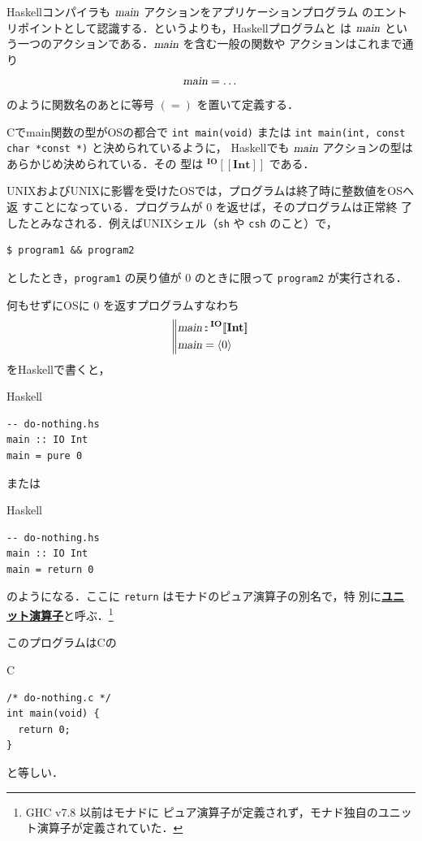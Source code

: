 \documentclass[a5paper,twoside,fleqn,draft]{jsbook}
\def\[{[\![}
\def\]{]\!]}
\newcommand{\programminglanguage}[1]{\textsf{#1}}
\newcommand{\clang}{\programminglanguage{C}}
\newcommand{\haskell}{\programminglanguage{Haskell}}
\newcommand{\keyword}[1]{{\underline{\textbf{#1}}}}
\newcommand{\code}[1]{\texttt{#1}}
\newcommand{\filename}[1]{\texttt{#1}}
\newenvironment{ccode}{\begin{itembox}[r]{\clang}}{\end{itembox}}
\newenvironment{haskellcode}{\begin{itembox}[r]{\haskell}}{\end{itembox}}
\newcommand{\mBrace}{\Vert}
\newcommand{\mAction}[1]{\textsl{#1}}
\DeclareMathOperator{\mMain}{\mAction{main}}
\DeclareMathOperator{\mIn}{{:\!:}}
\newcommand{\mType}[1]{\mathbf{#1}} %
\newcommand{\mIntType}{\mType{Int}}
\newcommand{\mTypeAssemble}[2]{{}^{\mType{#1}}\[\mType{#2}\]}
\newcommand{\mIOType}[1]{\mTypeAssemble{IO}{#1}}
\newcommand{\mIOIntType}{\mIOType{\mIntType}}
\newcommand{\mPureWith}[1]{\langle#1\rangle}
\begin{document}
\haskell コンパイラも $\mMain$ アクションをアプリケーションプログラム
のエントリポイントとして認識する．というよりも，\haskell プログラムと
は $\mMain$ という一つのアクションである．$\mMain$ を含む一般の関数や
アクションはこれまで通り
\begin{equation}
\mMain=\dots
\end{equation}
のように関数名のあとに等号 $(=)$ を置いて定義する．

\clang でmain関数の型がOSの都合で \code{int main(void)} または
\code{int main(int, const char *const *)} と決められているように，
\haskell でも $\mMain$ アクションの型はあらかじめ決められている．その
型は $\mIOIntType$ である．

UNIXおよびUNIXに影響を受けたOSでは，プログラムは終了時に整数値をOSへ返
すことになっている．プログラムが $0$ を返せば，そのプログラムは正常終
了したとみなされる．例えばUNIXシェル（\filename{sh} や \filename{csh}
  のこと）で，
\begin{verbatim}
$ program1 && program2
\end{verbatim}
としたとき，\filename{program1} の戻り値が $0$ のときに限って
\filename{program2} が実行される．

何もせずにOSに $0$ を返すプログラムすなわち
\begin{equation}
\left\mBrace
\begin{aligned}
\mMain&\mIn{}\mIOIntType\\
\mMain&=\mPureWith{0}
\end{aligned}
\right.
\end{equation}
を\haskell で書くと，
\begin{haskellcode}
\begin{verbatim}
-- do-nothing.hs
main :: IO Int
main = pure 0
\end{verbatim}
\end{haskellcode}
または
\begin{haskellcode}
\begin{verbatim}
-- do-nothing.hs
main :: IO Int
main = return 0
\end{verbatim}
\end{haskellcode}
のようになる．ここに \code{return} はモナドのピュア演算子の別名で，特
別に\keyword{ユニット演算子}と呼ぶ．\footnote{GHC v7.8 以前はモナドに
  ピュア演算子が定義されず，モナド独自のユニット演算子が定義されていた．}

このプログラムは\clang の
\begin{ccode}
\begin{verbatim}
/* do-nothing.c */
int main(void) {
  return 0;
}
\end{verbatim}
\end{ccode}
と等しい．
\end{document}

